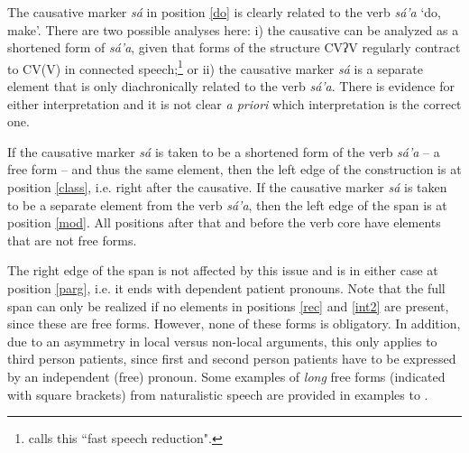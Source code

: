 \documentclass[output=paper]{langscibook}
\begin{document}
The causative marker \emph{sá} in position \ref{do} is clearly related to the verb \emph{sá'a} `do, make'. 
There are two possible analyses here: i) the causative can be analyzed as a shortened form of \emph{sá'a}, given that forms of the structure CVʔV regularly contract to CV(V) in connected speech;\footnote{\citet{macaulay1987cliticization} calls this ``fast speech reduction".} or ii) the causative marker \emph{sá} is a separate element that is only diachronically related to the verb \emph{sá'a}. There is evidence for either interpretation and it is not clear \emph{a priori} which interpretation is the correct one. 

If the causative marker \emph{sá} is taken to be a shortened form of the verb \emph{sá'a} -- a free form -- and thus the same element, then the left edge of the construction is at position \ref{class}, i.e. right after the causative. 
If the causative marker \emph{sá} is taken to be a separate element from the verb \emph{sá'a}, then the left edge of the span is at position \ref{mod}. All positions after that and before the verb core have elements that are not free forms.

The right edge of the span is not affected by this issue and is in either case at position \ref{parg}, i.e. it ends with dependent patient pronouns. Note that the full span can only be realized if no elements in positions \ref{rec} and \ref{int2} are present, since these are free forms. However, none of these forms is obligatory. In addition, due to an asymmetry in local versus non-local arguments, this only applies to third person patients, since first and second person patients have to be expressed by an independent (free) pronoun.
Some examples of \textit{long} free forms (indicated with square brackets) from naturalistic speech are provided in examples  to .
\end{document}
